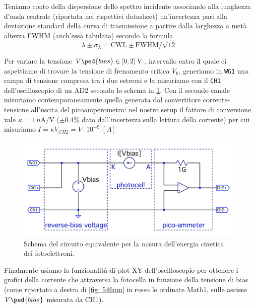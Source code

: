\documentclass[10pt, a4paper, italian]{article}
\begin{document}
Teniamo conto della dispersione dello spettro incidente associando alla
lunghezza d'onda centrale (riportata nei rispettivi datasheet) un'incertezza
pari alla deviazione standard della curva di trasmissione a partire dalla
larghezza a metà altezza FWHM (anch'essa tabulata) secondo la formula
\[
\lambda \pm \sigma_\lambda = \text{CWL} \pm \text{FWHM}/\sqrt{12}
\]

Per variare la tensione $V\ped{bias} \in [0, 2] \; \si{\V}$, intervallo entro
il quale ci aspettiamo di trovare la tensione di frenamento critica $V_0$,
generiamo in \verb+WG1+ una rampa di tensione compresa tra i due estremi e la
misuriamo con il \verb+CH1+ dell'oscilloscopio di un AD2 secondo lo schema in
\cref{schm: Imeas}.
Con il secondo canale misuriamo contemporaneamente quella generata dal
convertitore corrente-tensione all'uscita del picoamperometro: nel
nostro setup il fattore di conversione vale $\kappa = \SI{1}{n\A/\V}$
($\pm 0.4 \%$ dato dall'incertezza sulla lettura della corrente)
per cui misuriamo $I = \kappa V_{CH2} = V \cdot 10^{-9} \; [\si{A}]$
\begin{figure}[htbp]
    \centering
	\includegraphics[scale=0.2]{schm}
    \caption{Schema del circuito equivalente per la misura dell'energia
    cinetica dei fotoelettroni.
    \label{schm: Imeas}}
\end{figure}

Finalmente usiamo la funzionalità di plot XY dell'oscilloscopio per ottenere
i grafici della corrente che attraversa la fotocella in funzione della
tensione di bias (come riportato a destra di \cref{fig: 546nm} in rosso le
ordinate Math1, sulle ascisse $V\ped{bias}$ misurata da CH1).
\end{document}

